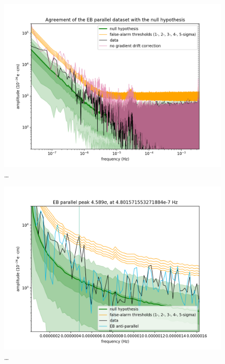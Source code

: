 \begin{figure}
  \centering
  \includegraphics[width=\linewidth]{gfx/axions/P_detection_and_no_GDC.png}
  \caption{\ldots}
  \label{fig:P_detection_and_no_GDC}
\end{figure}
\begin{figure}
  \centering
  \includegraphics[width=\linewidth]{gfx/axions/P_detection_peak_21.png}
  \caption{\ldots}
  \label{fig:P_detection_peak_21}
\end{figure}

